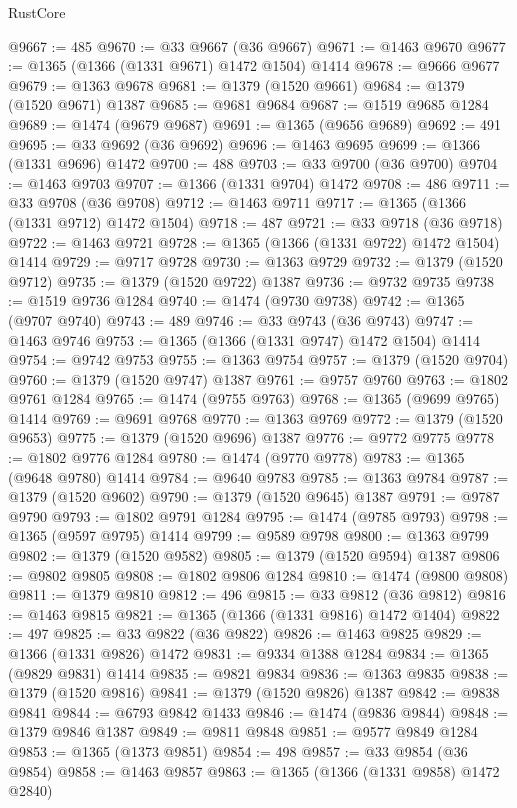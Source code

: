\begin{lexlean}{RustCore}
\begin{coremodule}
@9667 := 485
@9670 := @33 @9667 (@36 @9667)
@9671 := @1463 @9670
@9677 := @1365 (@1366 (@1331 @9671) @1472 @1504) @1414
@9678 := @9666 @9677
@9679 := @1363 @9678
@9681 := @1379 (@1520 @9661)
@9684 := @1379 (@1520 @9671) @1387
@9685 := @9681 @9684
@9687 := @1519 @9685 @1284
@9689 := @1474 (@9679 @9687)
@9691 := @1365 (@9656 @9689)
@9692 := 491
@9695 := @33 @9692 (@36 @9692)
@9696 := @1463 @9695
@9699 := @1366 (@1331 @9696) @1472
@9700 := 488
@9703 := @33 @9700 (@36 @9700)
@9704 := @1463 @9703
@9707 := @1366 (@1331 @9704) @1472
@9708 := 486
@9711 := @33 @9708 (@36 @9708)
@9712 := @1463 @9711
@9717 := @1365 (@1366 (@1331 @9712) @1472 @1504)
@9718 := 487
@9721 := @33 @9718 (@36 @9718)
@9722 := @1463 @9721
@9728 := @1365 (@1366 (@1331 @9722) @1472 @1504) @1414
@9729 := @9717 @9728
@9730 := @1363 @9729
@9732 := @1379 (@1520 @9712)
@9735 := @1379 (@1520 @9722) @1387
@9736 := @9732 @9735
@9738 := @1519 @9736 @1284
@9740 := @1474 (@9730 @9738)
@9742 := @1365 (@9707 @9740)
@9743 := 489
@9746 := @33 @9743 (@36 @9743)
@9747 := @1463 @9746
@9753 := @1365 (@1366 (@1331 @9747) @1472 @1504) @1414
@9754 := @9742 @9753
@9755 := @1363 @9754
@9757 := @1379 (@1520 @9704)
@9760 := @1379 (@1520 @9747) @1387
@9761 := @9757 @9760
@9763 := @1802 @9761 @1284
@9765 := @1474 (@9755 @9763)
@9768 := @1365 (@9699 @9765) @1414
@9769 := @9691 @9768
@9770 := @1363 @9769
@9772 := @1379 (@1520 @9653)
@9775 := @1379 (@1520 @9696) @1387
@9776 := @9772 @9775
@9778 := @1802 @9776 @1284
@9780 := @1474 (@9770 @9778)
@9783 := @1365 (@9648 @9780) @1414
@9784 := @9640 @9783
@9785 := @1363 @9784
@9787 := @1379 (@1520 @9602)
@9790 := @1379 (@1520 @9645) @1387
@9791 := @9787 @9790
@9793 := @1802 @9791 @1284
@9795 := @1474 (@9785 @9793)
@9798 := @1365 (@9597 @9795) @1414
@9799 := @9589 @9798
@9800 := @1363 @9799
@9802 := @1379 (@1520 @9582)
@9805 := @1379 (@1520 @9594) @1387
@9806 := @9802 @9805
@9808 := @1802 @9806 @1284
@9810 := @1474 (@9800 @9808)
@9811 := @1379 @9810
@9812 := 496
@9815 := @33 @9812 (@36 @9812)
@9816 := @1463 @9815
@9821 := @1365 (@1366 (@1331 @9816) @1472 @1404)
@9822 := 497
@9825 := @33 @9822 (@36 @9822)
@9826 := @1463 @9825
@9829 := @1366 (@1331 @9826) @1472
@9831 := @9334 @1388 @1284
@9834 := @1365 (@9829 @9831) @1414
@9835 := @9821 @9834
@9836 := @1363 @9835
@9838 := @1379 (@1520 @9816)
@9841 := @1379 (@1520 @9826) @1387
@9842 := @9838 @9841
@9844 := @6793 @9842 @1433
@9846 := @1474 (@9836 @9844)
@9848 := @1379 @9846 @1387
@9849 := @9811 @9848
@9851 := @9577 @9849 @1284
@9853 := @1365 (@1373 @9851)
@9854 := 498
@9857 := @33 @9854 (@36 @9854)
@9858 := @1463 @9857
@9863 := @1365 (@1366 (@1331 @9858) @1472 @2840)

\end{coremodule}
\end{lexlean}
